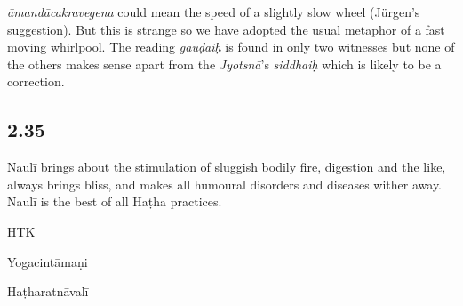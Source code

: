 \begin{ekdosis}
\begin{philcomm}[hp02_034]
\emph{āmandācakravegena} could mean the speed of a slightly slow wheel (Jürgen’s suggestion). But this is strange so we have adopted the usual metaphor of a fast moving whirlpool. The reading \emph{gauḍaiḥ} is found in only two witnesses but none of the others makes sense apart from the \emph{Jyotsnā}’s \emph{siddhaiḥ} which is likely to be a correction.

\end{philcomm}

\subsection*{2.35}
\begin{translation}[hp02_035]
Naulī brings about the stimulation of sluggish bodily fire, digestion and the like, always brings bliss, and makes all humoural disorders and diseases wither away. Naulī is the best of all Haṭha practices.
\end{translation}

\begin{sources}[hp02_035]
\end{sources}

\begin{testimonia}[hp02_035]
HTK

\begin{versinnote}
\end{versinnote}

Yogacintāmaṇi

\begin{versinnote}
\end{versinnote}

Haṭharatnāvalī

\begin{versinnote}
\end{versinnote}
\end{testimonia}


\end{ekdosis}
